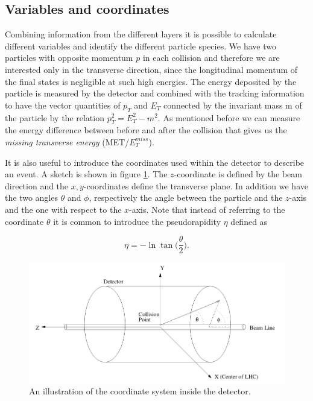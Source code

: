 \subsection{Variables and coordinates}
Combining information from the different layers it is possible to calculate different variables and identify the different particle species. We have two particles with opposite momentum $p$ in each collision and therefore we are interested only in the transverse direction, since the longitudinal momentum of the final states is negligible at such high energies. The energy deposited by the particle is measured by the detector and combined with the tracking information to have the vector quantities of $p_T$ and $E_T$ connected by the invariant mass m of the particle by the relation $p_T^2 = E_T^2 - m^2$. As mentioned before we can measure the energy difference between before and after the collision that gives us the \textit{missing transverse energy} (MET/$E_T^{miss}$). 

It is also useful to introduce the coordinates used within the detector to describe an event. A sketch is shown in figure \ref{fig:coordsys}. The $z$-coordinate is defined by the beam direction and the $x,y$-coordinates define the transverse plane. In addition we have the two angles $\theta$ and $\phi$, respectively the angle between the particle and the $z$-axis and the one with respect to the $x$-axis. Note that instead of referring to the coordinate $\theta$ it is common to introduce the pseudorapidity $\eta$ defined as 

\begin{equation}
    \eta = -\ln \tan \bigg(\frac{\theta}{2}\bigg).
\end{equation}

\begin{figure}[H]
    \centering
    \includegraphics[width = \textwidth]{Figures/FromOnline/coordinatesystem.png}
    \caption{An illustration of the coordinate system inside the detector\cite{coordinatesystem}.}
    \label{fig:coordsys}
\end{figure}

